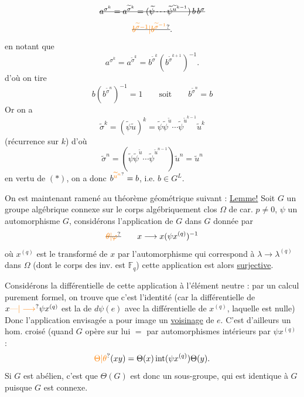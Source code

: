 \[
\deleted{a^{\sigma^k}=a^{\widetilde\sigma^k}=(\widetilde\psi\cdots\widetilde\psi^{\widetilde u^{k-1}})\,b\,b^\sigma}
\]
\[
\deleted{\unsure{b^{\widetilde\sigma-1}|b^{\widetilde\sigma^{-1}}}}.
\]
en notant que
\[
a^{\sigma^k}=a^{\widetilde\sigma^k}=b^{\widetilde\sigma^k}(b^{\widetilde\sigma^{k+1}})^{-1}.
\]
d'où on tire
\[
b(b^{\widetilde\sigma^n})^{-1}=1\qquad\text{soit}\qquad b^{\widetilde\sigma^n}=b
\]
Or on a
\[
\widetilde\sigma^k=(\widetilde\psi\widetilde u)^k=\widetilde\psi\widetilde\psi^{\widetilde u}\cdots\widetilde\psi^{\widetilde u^{k-1}}\widetilde u^k
\]
(récurrence sur $k$) d'où
\[
\widetilde\sigma^n=(\widetilde\psi\widetilde\psi^{\widetilde u}\cdots\widetilde\psi^{\widetilde u^{n-1}})\widetilde u^n=\widetilde u^n
\]
en vertu de $(*)$, on a donc $b^{\unsure{\widetilde u^n}}=b$, i.e. $b\in G^L$.

On est maintenant ramené au théorème géométrique suivant :
\uline{Lemme!} Soit $G$ un groupe algébrique connexe sur le corps algébriquement clos $\Omega$ de car. $p\ne0$,   $\psi$ un automorphisme   $G$, considérons   l'application de $G$ dans $G$ donnée par
\[
\deleted{\unsure{\theta|\varphi}}\qquad x\longrightarrow x(\psi x^{(q)})^{-1}
\]
où $x^{(q)}$ est le transformé de $x$ par l'automorphisme qui correspond à $\lambda\longrightarrow\lambda^{(q)}$ dans $\Omega$ (dont le corps des inv. est $\mathbb F_q$) cette application est alors \uline{surjective}.

Considérons la différentielle de cette application à l'élément neutre : par un calcul purement formel, on trouve que c'est l'identité (car la différentielle de $x\unsure{\text{---}|\longrightarrow}\psi x^{(q)}$ est la  de $d\psi(e)$ avec la différentielle de $x^{(q)}$, laquelle est nulle)
Donc l'application envisagée a pour image un \uline{voisinage} de $e$. C'est d'ailleurs un hom. croisé (quand $G$ opère sur lui $=$ par automorphismes intérieurs par $\psi x^{(q)}$ :
\[
\unsure{\Theta|\theta}(xy)=\Theta(x)\operatorname{int}(\psi x^{(q)})\Theta(y).
\]
Si $G$ est abélien, c'est que $\Theta(G)$ est donc un sous-groupe, qui est  identique à $G$ puisque $G$ est connexe.

